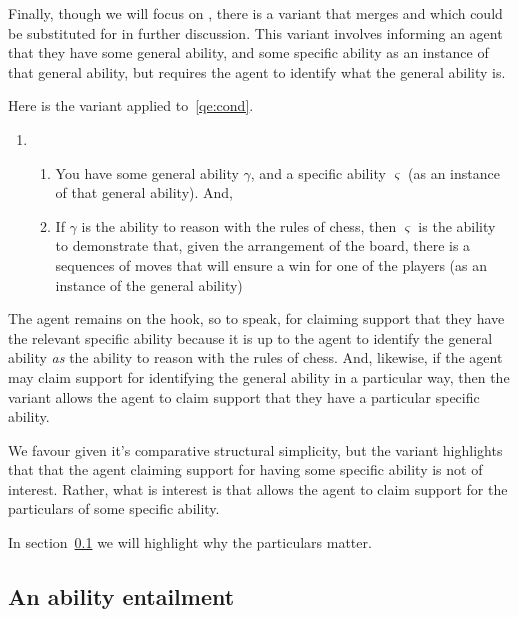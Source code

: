 \begin{note}
  Finally, though we will focus on \gsi{}, there is a variant that merges \gsi{} and \dsi{} which could be substituted for \gsi{} in further discussion.
  This variant involves informing an agent that they have some general ability, and some specific ability as an instance of that general ability, but requires the agent to identify what the general ability is.

  Here is the variant applied to~\ref{qe:cond}.
  \begin{enumerate}[label=(\gsi{}\(^{'}\):\arabic*), ref=(\gsi{}\(^{'}\):\arabic*)]
  \item
    \begin{enumerate}
    \item You have some general ability \(\gamma\), and a specific ability \(\varsigma\) (as an instance of that general ability). And,
    \item If \(\gamma\) is the ability to reason with the rules of chess, then \(\varsigma\) is the ability to demonstrate that, given the arrangement of the board, there is a sequences of moves that will ensure a win for one of the players (as an instance of the general ability)
    \end{enumerate}
  \end{enumerate}
  The agent remains on the hook, so to speak, for claiming support that they have the relevant specific ability because it is up to the agent to identify the general ability \emph{as} the ability to reason with the rules of chess.
  And, likewise, if the agent may claim support for identifying the general ability in a particular way, then the variant allows the agent to claim support that they have a particular specific ability.

  We favour \gsi{} given it's comparative structural simplicity, but the variant highlights that that the agent claiming support for having some specific ability is not of interest.
  Rather, what is interest is that \gsi{} allows the agent to claim support for the particulars of some specific ability.

  In section~\ref{sec:ability-entailment} we will highlight why the particulars matter.
\end{note}

\subsection{An ability entailment}
\label{sec:ability-entailment}

